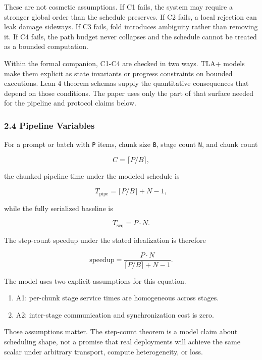 \documentclass[
  11pt,
]{article}
\providecommand{\tightlist}{%
  \setlength{\itemsep}{0pt}\setlength{\parskip}{0pt}}
\begin{document}
These are not cosmetic assumptions. If C1 fails, the system may require
a stronger global order than the schedule preserves. If C2 fails, a
local rejection can leak damage sideways. If C3 fails, fold introduces
ambiguity rather than removing it. If C4 fails, the path budget never
collapses and the schedule cannot be treated as a bounded computation.

Within the formal companion, C1-C4 are checked in two ways. TLA+ models
make them explicit as state invariants or progress constraints on
bounded executions. Lean 4 theorem schemas supply the quantitative
consequences that depend on those conditions. The paper uses only the
part of that surface needed for the pipeline and protocol claims below.

\subsubsection{2.4 Pipeline Variables}\label{pipeline-variables}

For a prompt or batch with \texttt{P} items, chunk size \texttt{B},
stage count \texttt{N}, and chunk count

\[
C = \lceil P / B \rceil,
\]

the chunked pipeline time under the modeled schedule is

\[
T_{\mathrm{pipe}} = \lceil P/B \rceil + N - 1,
\]

while the fully serialized baseline is

\[
T_{\mathrm{seq}} = P \cdot N.
\]

The step-count speedup under the stated idealization is therefore

\[
\mathrm{speedup} = \frac{P \cdot N}{\lceil P/B \rceil + N - 1}.
\]

The model uses two explicit assumptions for this equation.

\begin{enumerate}
\def\labelenumi{\arabic{enumi}.}
\tightlist
\item
  A1: per-chunk stage service times are homogeneous across stages.
\item
  A2: inter-stage communication and synchronization cost is zero.
\end{enumerate}

Those assumptions matter. The step-count theorem is a model claim about
scheduling shape, not a promise that real deployments will achieve the
same scalar under arbitrary transport, compute heterogeneity, or loss.
\end{document}
